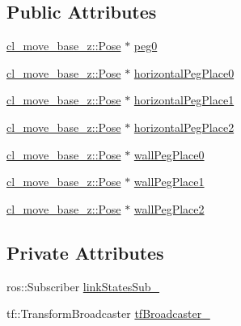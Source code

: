 \subsection*{Public Attributes}
\begin{DoxyCompactItemize}
\item 
\hyperlink{classcl__move__base__z_1_1Pose}{cl\+\_\+move\+\_\+base\+\_\+z\+::\+Pose} $\ast$ \hyperlink{classsm__panda__moveit_1_1ClPerceptionSystem_a41bf0f3e7549ef608c92dbe7b592b7bc}{peg0}
\item 
\hyperlink{classcl__move__base__z_1_1Pose}{cl\+\_\+move\+\_\+base\+\_\+z\+::\+Pose} $\ast$ \hyperlink{classsm__panda__moveit_1_1ClPerceptionSystem_ad87d29cef1fd60c7a8bedd6171a14704}{horizontal\+Peg\+Place0}
\item 
\hyperlink{classcl__move__base__z_1_1Pose}{cl\+\_\+move\+\_\+base\+\_\+z\+::\+Pose} $\ast$ \hyperlink{classsm__panda__moveit_1_1ClPerceptionSystem_aa47ca5defa02b42839311b6c50f9709a}{horizontal\+Peg\+Place1}
\item 
\hyperlink{classcl__move__base__z_1_1Pose}{cl\+\_\+move\+\_\+base\+\_\+z\+::\+Pose} $\ast$ \hyperlink{classsm__panda__moveit_1_1ClPerceptionSystem_a886995d808317e3170976ccac46f1f0b}{horizontal\+Peg\+Place2}
\item 
\hyperlink{classcl__move__base__z_1_1Pose}{cl\+\_\+move\+\_\+base\+\_\+z\+::\+Pose} $\ast$ \hyperlink{classsm__panda__moveit_1_1ClPerceptionSystem_a67d7e0e6f1436940c73e60e61c398779}{wall\+Peg\+Place0}
\item 
\hyperlink{classcl__move__base__z_1_1Pose}{cl\+\_\+move\+\_\+base\+\_\+z\+::\+Pose} $\ast$ \hyperlink{classsm__panda__moveit_1_1ClPerceptionSystem_a9328dc153ed97df7dce0b974ac922381}{wall\+Peg\+Place1}
\item 
\hyperlink{classcl__move__base__z_1_1Pose}{cl\+\_\+move\+\_\+base\+\_\+z\+::\+Pose} $\ast$ \hyperlink{classsm__panda__moveit_1_1ClPerceptionSystem_a85c6cf26d9284a08157382d375153195}{wall\+Peg\+Place2}
\end{DoxyCompactItemize}
\subsection*{Private Attributes}
\begin{DoxyCompactItemize}
\item 
ros\+::\+Subscriber \hyperlink{classsm__panda__moveit_1_1ClPerceptionSystem_aebd5e06a7524fbdd05904156529ed816}{link\+States\+Sub\+\_\+}
\item 
tf\+::\+Transform\+Broadcaster \hyperlink{classsm__panda__moveit_1_1ClPerceptionSystem_a72da0ac3f9215b3a2a78f4bb02442844}{tf\+Broadcaster\+\_\+}
\end{DoxyCompactItemize}
